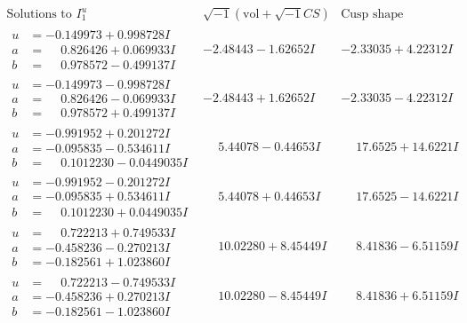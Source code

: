 \documentclass[1p]{elsarticle_modified}
\theoremstyle{definition}
\newcommand{\I}{\sqrt{-1}}
\begin{document}
$$\begin{array}{c|c|c}  
\text{Solutions to }I^u_{1}& \I (\text{vol} + \sqrt{-1}CS) & \text{Cusp shape}\\
 \hline 
\begin{aligned}
u &= -0.149973 + 0.998728 I \\
a &= \phantom{-}0.826426 + 0.069933 I \\
b &= \phantom{-}0.978572 - 0.499137 I\end{aligned}
 & -2.48443 - 1.62652 I & -2.33035 + 4.22312 I \\ \hline\begin{aligned}
u &= -0.149973 - 0.998728 I \\
a &= \phantom{-}0.826426 - 0.069933 I \\
b &= \phantom{-}0.978572 + 0.499137 I\end{aligned}
 & -2.48443 + 1.62652 I & -2.33035 - 4.22312 I \\ \hline\begin{aligned}
u &= -0.991952 + 0.201272 I \\
a &= -0.095835 - 0.534611 I \\
b &= \phantom{-}0.1012230 - 0.0449035 I\end{aligned}
 & \phantom{-}5.44078 - 0.44653 I & \phantom{-}17.6525 + 14.6221 I \\ \hline\begin{aligned}
u &= -0.991952 - 0.201272 I \\
a &= -0.095835 + 0.534611 I \\
b &= \phantom{-}0.1012230 + 0.0449035 I\end{aligned}
 & \phantom{-}5.44078 + 0.44653 I & \phantom{-}17.6525 - 14.6221 I \\ \hline\begin{aligned}
u &= \phantom{-}0.722213 + 0.749533 I \\
a &= -0.458236 - 0.270213 I \\
b &= -0.182561 + 1.023860 I\end{aligned}
 & \phantom{-}10.02280 + 8.45449 I & \phantom{-}8.41836 - 6.51159 I \\ \hline\begin{aligned}
u &= \phantom{-}0.722213 - 0.749533 I \\
a &= -0.458236 + 0.270213 I \\
b &= -0.182561 - 1.023860 I\end{aligned}
 & \phantom{-}10.02280 - 8.45449 I & \phantom{-}8.41836 + 6.51159 I \\ \hline\begin{aligned}

\end{aligned}
\end{array}$$
\end{document}
